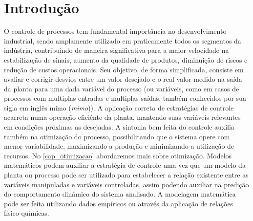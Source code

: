 \chapter{Introdução}

O controle de processos tem fundamental importância no desenvolvimento industrial, sendo amplamente utilizado em praticamente todos os segmentos da indústria, contribuindo de maneira significativa para a maior velocidade na estabilização de sinais, aumento da qualidade de produtos, diminuição de riscos e redução de custos operacionais. Seu objetivo, de forma simplificada, consiste em avaliar e corrigir desvios entre um valor desejado e o real valor medido na saída da planta para uma dada variável do processo (ou variáveis, como em casos de processos com multiplas entradas e multiplas saídas, também conhecidos por sua sigla em inglês \acrshort{mimo} (\textit{\acrlong{mimo}})). A aplicação correta de estratégias de controle acarreta numa operação eficiênte da planta, mantendo suas variáveis relevantes em condições próximas as desejadas. A sintonia bem feita do controle auxilia também na otimização do processo, possibilitando que o sistema opere com menor variabilidade, maximizando a produção e minimizando a utilização de recursos. No \autoref{cap_otimizacao} abordaremos mais sobre otimização.
Modelos matemáticos podem auxiliar a estratégia de controle uma vez que um modelo da planta ou processo pode ser utilizado para estabelecer a relação existente entre as variáveis manipuladas e variáveis controladas, assim podendo auxiliar na predição do comportamento dinâmico do sistema analisado. A modelagem matemática pode ser feita utilizando dados empíricos ou através da aplicação de relações físico-químicas.

